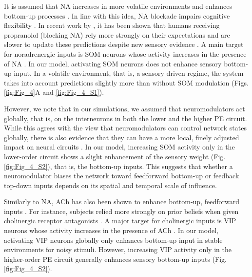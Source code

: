 \documentclass[10pt,a4paper]{article}
\begin{document}
It is assumed that NA increases in more volatile environments and enhances bottom-up processes \citep{hasselmo1997noradrenergic, yon2021precision}. In line with this idea, NA blockade impairs cognitive flexibility \citep{ridley1981new, janitzky2015optogenetic}. In recent work by \cite{lawson2021computational}, it has been shown that humans receiving propranolol (blocking NA) rely more strongly on their expectations and are slower to update these predictions despite new sensory evidence \citep{yon2021precision}. A main target for noradrenergic inputs is SOM neurons whose activity increases in the presence of NA \citep[reviewed in, e.g.,][]{urban2016somatostatin, hattori2017functions, swanson2019hiring}. In our model, activating SOM neurons does not enhance sensory bottom-up input. In a volatile environment, that is, a sensory-driven regime, the system takes into account predictions slightly more than without SOM modulation (Figs. \ref{fig:Fig_4}A and \ref{fig:Fig_4_S1}). 

However, we note that in our simulations, we assumed that neuromodulators act globally, that is, on the interneurons in both the lower and the higher PE circuit. While this agrees with the view that neuromodulators can control network states globally, there is also evidence that they can have a more local, finely adjusted impact on neural circuits \citep{nadim2014neuromodulation}. In our model, increasing SOM activity only in the lower-order circuit shows a slight enhancement of the sensory weight (Fig. \ref{fig:Fig_4_S2}), that is, the bottom-up inputs. This suggests that whether a neuromodulator biases the network toward feedforward bottom-up or feedback top-down inputs depends on its spatial and temporal scale of influence.

Similarly to NA, ACh has also been shown to enhance bottom-up, feedforward inputs \citep[reviewed in, e.g.,][]{yu2005uncertainty, marshall2016pharmacological}. For instance, subjects relied more strongly on prior beliefs when given cholinergic receptor antagonists \citep{marshall2016pharmacological}. A major target for cholinergic inputs is VIP neurons whose activity increases in the presence of ACh \citep[reviewed in, e.g.,][]{wester2014behavioral, hattori2017functions, swanson2019hiring}. In our model, activating VIP neurons globally only enhances bottom-up input in stable environments for noisy stimuli. However, increasing VIP activity only in the higher-order PE circuit generally enhances sensory bottom-up inputs (Fig. \ref{fig:Fig_4_S2}).
\end{document}
